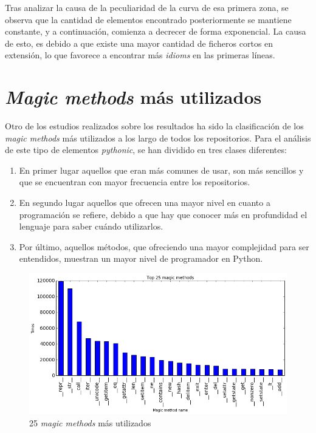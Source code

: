 \documentclass[a4paper, 12pt]{book}
\begin{document}
Tras analizar la causa de la peculiaridad de la curva de esa primera zona, se observa que la cantidad de elementos encontrado posteriormente se mantiene constante, y a continuación, comienza a decrecer de forma exponencial. La causa de esto, es debido a que existe una mayor cantidad de ficheros cortos en extensión, lo que favorece a encontrar más \textit{idioms} en las primeras líneas.




\section{\textit{Magic methods} más utilizados}

Otro de los estudios realizados sobre los resultados ha sido la clasificación de los \textit{magic methods} más utilizados a los largo de todos los repositorios.
Para el análisis de este tipo de elementos \textit{pythonic}, se han dividido en tres clases diferentes:
\begin{enumerate}
    \item En primer lugar aquellos que eran más comunes de usar, son más sencillos y que se encuentran con mayor frecuencia entre los repositorios.
    \item En segundo lugar aquellos que ofrecen una mayor nivel en cuanto a programación se refiere, debido a que hay que conocer más en profundidad el lenguaje para saber cuándo utilizarlos.
    \item Por último, aquellos métodos, que ofreciendo una mayor complejidad para ser entendidos, muestran un mayor nivel de programador en Python.
\end{enumerate}

\begin{figure}[t]
\centering
\includegraphics[width=140mm]{img/graphs/magic_methods.png}
\caption{25 \textit{magic methods} más utilizados}
\label{fig:magic_methods}
\end{figure}
\end{document}
